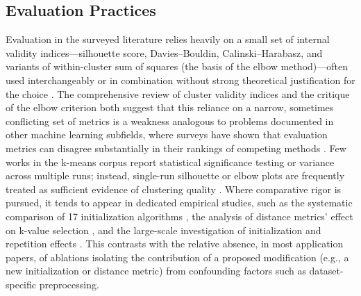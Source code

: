 \subsection{Evaluation Practices}
Evaluation in the surveyed literature relies heavily on a small set of internal validity indices---silhouette score, Davies--Bouldin, Calinski--Harabasz, and variants of within-cluster sum of squares (the basis of the elbow method)---often used interchangeably or in combination without strong theoretical justification for the choice \cite{ashari2023analysis,sagala2022discovering,saputra2020effect,myagmarsuren2024exploring}. The comprehensive review of cluster validity indices \cite{ikotun2025cluster} and the critique of the elbow criterion \cite{schubert2023stop} both suggest that this reliance on a narrow, sometimes conflicting set of metrics is a weakness analogous to problems documented in other machine learning subfields, where surveys have shown that evaluation metrics can disagree substantially in their rankings of competing methods \cite{bi2024inconsistency,lee2023survey,srb2023navigating,terven2025comprehensive}. Few works in the k-means corpus report statistical significance testing or variance across multiple runs; instead, single-run silhouette or elbow plots are frequently treated as sufficient evidence of clustering quality \cite{myagmarsuren2024exploring,maori2023metode}. Where comparative rigor is pursued, it tends to appear in dedicated empirical studies, such as the systematic comparison of 17 initialization algorithms \cite{harris2022extensive}, the analysis of distance metrics' effect on k-value selection \cite{saputra2020effect,sthakare2015performance,ghazal2021performances}, and the large-scale investigation of initialization and repetition effects \cite{franti2019how}. This contrasts with the relative absence, in most application papers, of ablations isolating the contribution of a proposed modification (e.g., a new initialization or distance metric) from confounding factors such as dataset-specific preprocessing.


